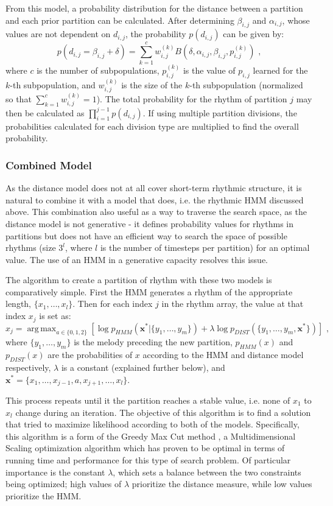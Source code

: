 \documentclass[ author={Stephen Livermore-Tozer},
				supervisor={Dr. Peter Flach},
				degree={MEng},
				title={Algorithmic Co-composition Using Machine Learning},
				subtitle={},
				type={research},
				year={2016} ]{dissertation}
\DeclareMathOperator*{\argmax}{arg\,max}
\begin{document}
	From this model, a probability distribution for the distance between a partition and each prior partition can be calculated. After determining $\beta_{i,j}$ and $\alpha_{i,j}$, whose values are not dependent on $d_{i,j}$, the probability $p(d_{i,j})$ can be given by:
	$$p(d_{i,j} = \beta_{i,j} + \delta) = \sum_{k=1}^{c} w_{i,j}^{(k)} B(\delta,\alpha_{i,j},\beta_{i,j},p_{i,j}^{(k)}) \text{ ,}$$
	where $c$ is the number of subpopulations, $p_{i,j}^{(k)}$ is the value of $p_{i,j}$ learned for the $k$-th subpopulation, and $w_{i,j}^{(k)}$ is the size of the $k$-th subpopulation (normalized so that $\sum_{k=1}^{c} w_{i,j}^{(k)} = 1$). The total probability for the rhythm of partition $j$ may then be calculated as $\prod_{i=1}^{j-1} p(d_{i,j})$. If using multiple partition divisions, the probabilities calculated for each division type are multiplied to find the overall probability. 
	
	\subsubsection{Combined Model}
	
	As the distance model does not at all cover short-term rhythmic structure, it is natural to combine it with a model that does, i.e. the rhythmic HMM discussed above. This combination also useful as a way to traverse the search space, as the distance model is not generative - it defines probability values for rhythms in partitions but does not have an efficient way to search the space of possible rhythms (size $3^l$, where $l$ is the number of timesteps per partition) for an optimal value. The use of an HMM in a generative capacity resolves this issue.
	
	The algorithm to create a partition of rhythm with these two models is comparatively simple. First the HMM generates a rhythm of the appropriate length, $\{x_1,\dots,x_l\}$. Then for each index $j$ in the rhythm array, the value at that index $x_j$ is set as:
	$$ x_j = \argmax_{a \in \{0,1,2\}} \left[ \log p_{HMM}(\mathbf{x^*} | \{y_1,\dots,y_m\}) + \lambda \log p_{DIST}(\{y_1,\dots,y_m,\mathbf{x^*}\}) \right] \text{ ,}$$
	where $\{y_1,\dots,y_m\}$ is the melody preceding the new partition, $p_{HMM}(x)$ and $p_{DIST}(x)$ are the probabilities of $x$ according to the HMM and distance model respectively, $\lambda$ is a constant (explained further below), and $\mathbf{x^*} = \{x_1,\dots,x_{j-1},a,x_{j+1},\dots,x_l\}$.
	
	This process repeats until it the partition reaches a stable value, i.e. none of $x_1$ to $x_l$ change during an iteration. The objective of this algorithm is to find a solution that tried to maximize likelihood according to both of the models. Specifically, this algorithm is a form of the Greedy Max Cut method \cite{rohde2002methods}, a Multidimensional Scaling optimization algorithm which has proven to be optimal in terms of running time and performance for this type of search problem. Of particular importance is the constant $\lambda$, which sets a balance between the two constraints being optimized; high values of $\lambda$ prioritize the distance measure, while low values prioritize the HMM.
	
\end{document}
